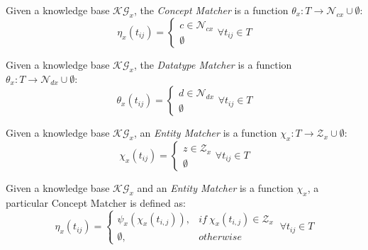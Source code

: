 \documentclass{llncs}
\begin{document}
\begin{definition}
      Given a knowledge base $\mathcal{KG}_x$, the \textit{Concept Matcher} is a function $\theta_x: T \to \mathcal{N}_{cx} \cup \emptyset$:
      \begin{equation}
            \eta_x(t_{ij})=
            \begin{cases}
                  c\in\mathcal{N}_{cx}
                  \\
                  \emptyset
            \end{cases}
            \forall t_{ij} \in T
      \end{equation}
\end{definition}
\begin{definition}
      Given a knowledge base $\mathcal{KG}_x$, the \textit{Datatype Matcher} is a function $\theta_x: T \to \mathcal{N}_{dx} \cup \emptyset$:
      \begin{equation}
            \theta_x(t_{ij})=
            \begin{cases}
                  d\in\mathcal{N}_{dx}
                  \\
                  \emptyset
            \end{cases}
            \forall t_{ij} \in T
      \end{equation}
\end{definition}

\begin{definition} Given a knowledge base $\mathcal{KG}_x$, an \textit{Entity Matcher} is a function $\chi_x: T \to \mathcal{Z}_x \cup \emptyset$:
      \begin{equation}
            \chi_x(t_{ij})=
            \begin{cases}
                  z\in\mathcal{Z}_x
                  \\
                  \emptyset
            \end{cases}
            \forall t_{ij} \in T
      \end{equation}
\end{definition}

\begin{lemma} Given a knowledge base $\mathcal{KG}_x$ and an \textit{Entity Matcher} is a function $\chi_x$, a particular Concept Matcher is defined as:
      \begin{equation}
            \eta_x(t_{ij})=
            \begin{cases}
                  \psi_x(\chi_x(t_{i,j})), & if~ \chi_x(t_{i,j})\in \mathcal{Z}_x
                  \\
                  \emptyset,               & otherwise
            \end{cases}
            ~\forall t_{ij} \in T
      \end{equation}
\end{lemma}
\end{document}
